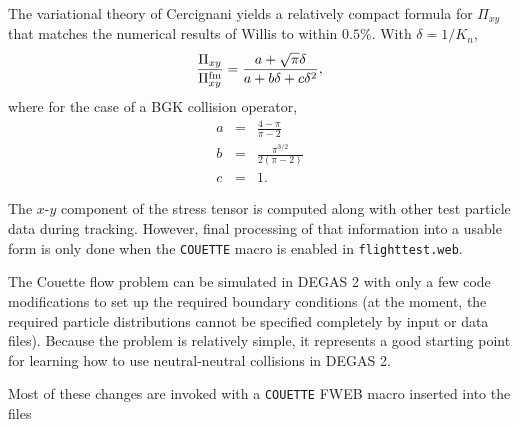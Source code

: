 \documentclass[12pt]{report}
\begin{document}
The variational theory of Cercignani\cite{Cerc69,Cerc75} yields a 
relatively compact formula for $\Pi_{xy}$ that matches the 
numerical results of Willis\cite{Will62} to within $0.5 \%$.
With $\delta = 1 / K_{n}$,
\begin{equation}
\frac{\Pi_{xy}}{\Pi_{xy}^{\rm fm}} = \frac{a + \sqrt{\pi} \delta}
{a + b \delta + c \delta^{2}},
\end{equation}
where for the case of a BGK collision operator,
\begin{eqnarray}
a & = & \frac{4 - \pi}{\pi - 2} \nonumber \\
b & = & \frac{\pi^{3/2}}{2(\pi - 2)} \nonumber \\
c & = & 1.
\label{cercig}
\end{eqnarray}

The $x$-$y$ component of the stress tensor is computed along with other
test particle data during tracking. However, final processing of that
information into a usable form is only done when the \verb+COUETTE+
macro is enabled in {\tt flighttest.web}.

The Couette flow problem can be simulated in DEGAS 2 with only a few
code modifications to set up the required boundary conditions (at the moment,
the required particle distributions cannot be specified completely
by input or data files). Because the problem is relatively simple, it
represents a good starting point for learning how to use 
neutral-neutral collisions in DEGAS 2.

Most of these changes are invoked with  a \verb+COUETTE+ 
FWEB macro inserted into the files
\end{document}
